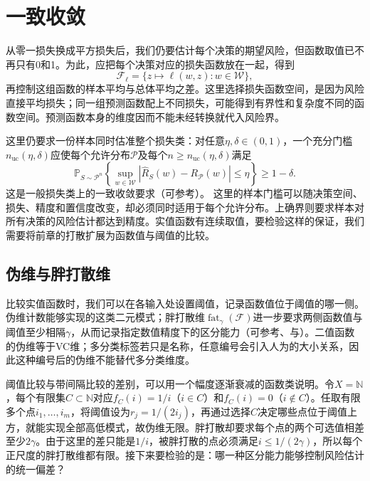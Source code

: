 \section{一致收敛}
\label{sec:real-valued-classes}

从零一损失换成平方损失后，我们仍要估计每个决策的期望风险，但函数取值已不再只有0和1。为此，应把每个决策对应的损失函数放在一起，得到
\[
 \mathcal F_\ell=\{z\mapsto\ell(w,z):w\in\mathcal W\},
\]
再控制这组函数的样本平均与总体平均之差。这里选择损失函数空间，是因为风险直接平均损失；同一组预测函数配上不同损失，可能得到有界性和复杂度不同的函数空间。预测函数本身的维度因而不能未经转换就代入风险界。

\label{def:general-uniform-convergence}
这里仍要求一份样本同时估准整个损失类：对任意$\eta,\delta\in(0,1)$，一个充分门槛$n_{\mathrm{uc}}(\eta,\delta)$应使每个允许分布$\mathcal P$及每个$n\geq n_{\mathrm{uc}}(\eta,\delta)$满足
\[
 \mathbb P_{S\sim\mathcal P^n}\!\left\{
 \sup_{w\in\mathcal W}|\hat R_S(w)-R_{\mathcal P}(w)|\leq\eta
 \right\}\geq1-\delta.
\]
这是一般损失类上的一致收敛要求（可参考）。
这里的样本门槛可以随决策空间、损失、精度和置信度改变，却必须同时适用于每个允许分布。上确界则要求样本对所有决策的风险估计都达到精度。实值函数有连续取值，要检验这样的保证，我们需要将前章的打散扩展为函数值与阈值的比较。

\subsection{伪维与胖打散维}

比较实值函数时，我们可以在各输入处设置阈值，记录函数值位于阈值的哪一侧。伪维计数能够实现的这类二元模式；胖打散维$\operatorname{fat}_\gamma(\mathcal F)$进一步要求两侧函数值与阈值至少相隔$\gamma$，从而记录指定数值精度下的区分能力（可参考、与）。二值函数的伪维等于VC维；多分类标签若只是名称，任意编号会引入人为的大小关系，因此这种编号后的伪维不能替代多分类维度。

阈值比较与带间隔比较的差别，可以用一个幅度逐渐衰减的函数类说明。令$X=\mathbb N$，每个有限集$C\subset\mathbb N$对应$f_C(i)=1/i$（$i\in C$）和$f_C(i)=0$（$i\notin C$）。任取有限多个点$i_1,\ldots,i_m$，将阈值设为$r_j=1/(2i_j)$，再通过选择$C$决定哪些点位于阈值上方，就能实现全部高低模式，故伪维无限。胖打散却要求每个点的两个可选值相差至少$2\gamma$。由于这里的差只能是$1/i$，被胖打散的点必须满足$i\leq1/(2\gamma)$，所以每个正尺度的胖打散维都有限。接下来要检验的是：哪一种区分能力能够控制风险估计的统一偏差？

